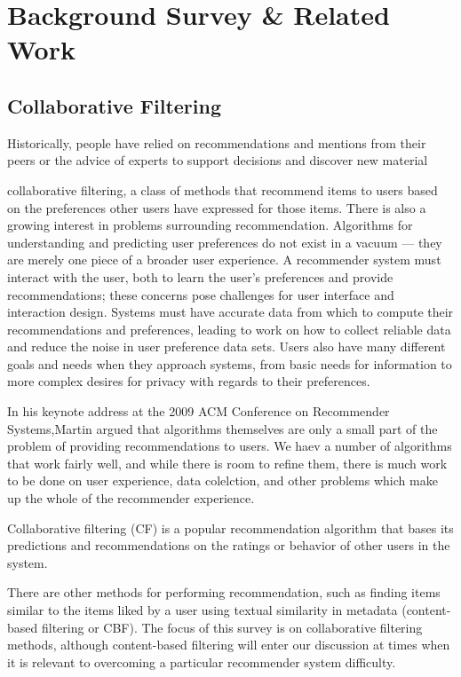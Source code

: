 \chapter{Background Survey \& Related Work}\label{C:background}

\section{Collaborative Filtering}

Historically, people have relied on recommendations and mentions
from their peers or the advice of experts to support decisions and discover
new material 

collaborative filtering, a class of methods that
recommend items to users based on the preferences other users have
expressed for those items.
There is also a growing interest in problems surrounding
recommendation. Algorithms for understanding and predicting user
preferences do not exist in a vacuum — they are merely one piece of
a broader user experience. A recommender system must interact with
the user, both to learn the user’s preferences and provide recommendations;
these concerns pose challenges for user interface and interaction
design. Systems must have accurate data from which to compute their
recommendations and preferences, leading to work on how to collect
reliable data and reduce the noise in user preference data sets. Users
also have many different goals and needs when they approach systems,
from basic needs for information to more complex desires for privacy
with regards to their preferences.

In his keynote address at the 2009 ACM Conference on Recommender Systems,Martin \cite{martin2009recsys} argued that algorithms themselves are only a small part of the problem of providing recommendations to users. We haev a number of algorithms that work fairly well, and while there is room to refine them, there is much work to be done on user experience, data colelction, and other problems which make up the whole of the recommender experience. 

Collaborative filtering (CF) is a popular recommendation algorithm
that bases its predictions and recommendations on the ratings or behavior
of other users in the system.

There are other methods for performing recommendation, such as
finding items similar to the items liked by a user using textual similarity
in metadata (content-based filtering or CBF). The focus of this survey
is on collaborative filtering methods, although content-based filtering
will enter our discussion at times when it is relevant to overcoming a particular recommender system difficulty.

